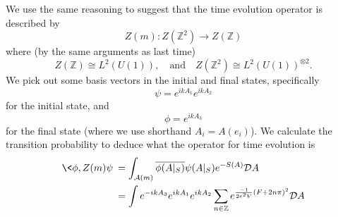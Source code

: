 We use the same reasoning to suggest that the time evolution
operator is described by
\begin{equation}%
Z(m):Z(\mathbb{Z}^{2})\to Z(\mathbb{Z})
\end{equation}
where (by the same arguments as last time)
\begin{equation}%
Z(\mathbb{Z})\cong L^{2}(U(1)),\quad\text{and}\quad
Z(\mathbb{Z}^{2})\cong L^{2}(U(1))^{\otimes 2}.
\end{equation}
We pick out some basis vectors in the initial and final states,
specifically
\begin{equation}%
\psi = e^{ikA_{1}}e^{ikA_{2}}
\end{equation}
for the initial state, and
\begin{equation}%
\phi = e^{ikA_{3}}
\end{equation}
for the final state (where we use shorthand $A_{i}=A(e_{i})$). We
calculate the transition probability to deduce what the operator
for time evolution is
\begin{subequations}
\begin{align}
\<\phi,Z(m)\psi\> &= \int_{\mathcal{A}(m)}\overline{\phi(A|_{S})}\psi(A|_{S})e^{-S(A)}\mathcal{D}A\\
&= \int e^{-ikA_{3}}e^{ikA_{1}}e^{ikA_{2}}\sum_{n\in\mathbb{Z}}e^{\frac{-1}{2e^{2}V}(F+2n\pi)^{2}}\mathcal{D}A
\end{align}
\end{subequations}
